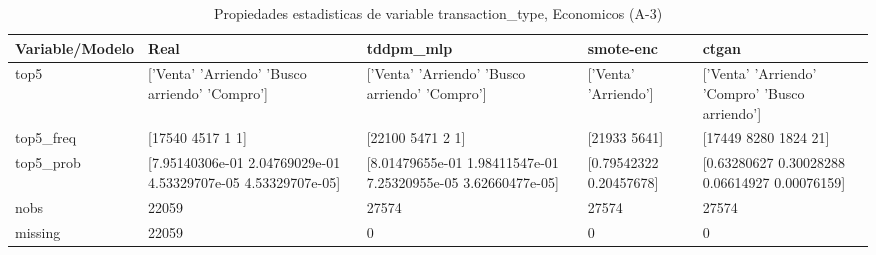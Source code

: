 \begin{table}[H]
\centering
\fontsize{8}{14}\selectfont
\caption{Propiedades  estadisticas de variable transaction\_type, Economicos (A-3)}
\label{table-stats-economicos-a-3-transaction_type}
\begin{tabular}{|l|m{10em}|m{10em}|m{10em}|m{10em}|}
\hline
 \rowcolor[gray]{0.8}
Variable/Modelo & Real & tddpm\_mlp & smote-enc & ctgan \\
\hline top5 & ['Venta' 'Arriendo' 'Busco arriendo' 'Compro'] & ['Venta' 'Arriendo' 'Busco arriendo' 'Compro'] & ['Venta' 'Arriendo'] & ['Venta' 'Arriendo' 'Compro' 'Busco arriendo'] \\
\hline top5\_freq & [17540  4517     1     1] & [22100  5471     2     1] & [21933  5641] & [17449  8280  1824    21] \\
\hline top5\_prob & [7.95140306e-01 2.04769029e-01 4.53329707e-05 4.53329707e-05] & [8.01479655e-01 1.98411547e-01 7.25320955e-05 3.62660477e-05] & [0.79542322 0.20457678] & [0.63280627 0.30028288 0.06614927 0.00076159] \\
\hline nobs & 22059 & 27574 & 27574 & 27574 \\
\hline missing & 22059 & 0 & 0 & 0 \\
\hline
\end{tabular}
\end{table}
